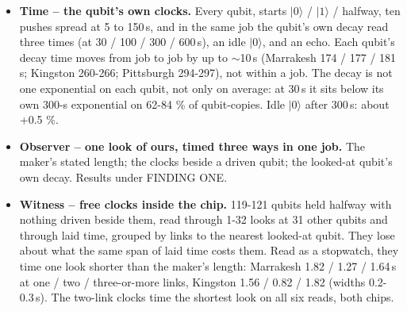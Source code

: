 \documentclass[11pt]{article}
\begin{document}
\begin{itemize}
\item \textbf{Time -- the qubit's own clocks.} Every qubit, starts \(|0\rangle\) / \(|1\rangle\) / halfway, ten pushes spread at 5 to 150\,\textmu s, and in the same job the qubit's own decay read three times (at 30 / 100 / 300 / 600\,\textmu s), an idle \(|0\rangle\), and an echo. Each qubit's decay time moves from job to job by up to \(\sim\)10\,\textmu s (Marrakesh 174 / 177 / 181\,\textmu s; Kingston 260-266; Pittsburgh 294-297), not within a job. The decay is not one exponential on each qubit, not only on average: at 30\,\textmu s it sits below its own 300-\textmu s exponential on 62-84 \% of qubit-copies. Idle \(|0\rangle\) after 300\,\textmu s: about +0.5 \%.
\item \textbf{Observer -- one look of ours, timed three ways in one job.} The maker's stated length; the clocks beside a driven qubit; the looked-at qubit's own decay. Results under FINDING ONE.
\item \textbf{Witness -- free clocks inside the chip.} 119-121 qubits held halfway with nothing driven beside them, read through 1-32 looks at 31 other qubits and through laid time, grouped by links to the nearest looked-at qubit. They lose about what the same span of laid time costs them. Read as a stopwatch, they time one look shorter than the maker's length: Marrakesh 1.82 / 1.27 / 1.64\,\textmu s at one / two / three-or-more links, Kingston 1.56 / 0.82 / 1.82 (widths 0.2-0.3\,\textmu s). The two-link clocks time the shortest look on all six reads, both chips.
\end{itemize}
\end{document}
